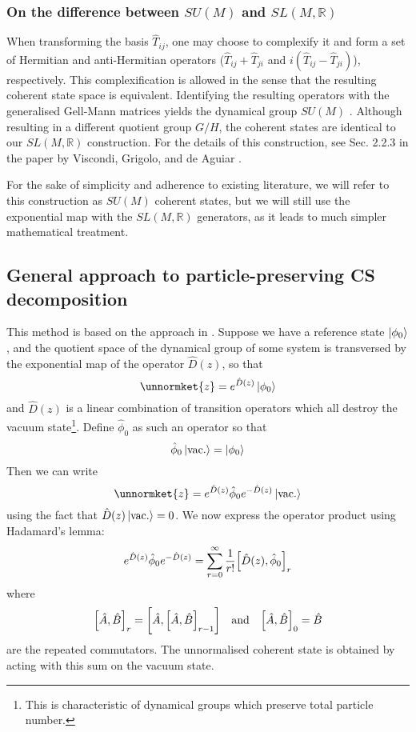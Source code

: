 \subsubsection{On the difference between $SU(M)$ and $SL(M,\mathbb{R})$}
	When transforming the basis $\hat{T}_{ij}$, one may choose to complexify it and form a set of Hermitian and anti-Hermitian operators ($\hat{T}_{ij}+\hat{T}_{ji}$ and $i(\hat{T}_{ij}-\hat{T}_{ji})$), respectively. This complexification is allowed in the sense that the resulting coherent state space is equivalent. Identifying the resulting operators with the generalised Gell-Mann matrices yields the dynamical group $SU(M)$ \cite{gellmann}. Although resulting in a different quotient group $G/H$, the coherent states are identical to our $SL(M,\mathbb{R})$ construction. For the details of this construction, see Sec. 2.2.3 in the paper by Viscondi, Grigolo, and de Aguiar \cite{aguiar}.
	
	For the sake of simplicity and adherence to existing literature, we will refer to this construction as $SU(M)$ coherent states, but we will still use the exponential map with the $SL(M,\mathbb{R})$ generators, as it leads to much simpler mathematical treatment.

\subsection{General approach to particle-preserving CS decomposition} \label{sec:general_decomposition}
	This method is based on the approach in \cite[App. E]{buonsante}. Suppose we have a reference state $\ket{\phi_0}$, and the quotient space of the dynamical group of some system is transversed by the exponential map of the operator $\hat{D}(z)$, so that
	\begin{equation}
	\unnormket{z}=e^{\hat{D}(z)}\ket{\phi_0}
	\end{equation}
	and $\hat{D}(z)$ is a linear combination of transition operators which all destroy the vacuum state\footnote{This is characteristic of dynamical groups which preserve total particle number.}. Define $\hat{\phi}_0$ as such an operator so that
	\begin{equation}
	\hat{\phi}_0\ket{\rm vac.} = \ket{\phi_0}
	\end{equation}
	Then we can write
	\begin{equation}
	\unnormket{z}=e^{\hat{D}(z)}\hat{\phi}_0e^{-\hat{D}(z)}\ket{\rm vac.}
	\end{equation}
	using the fact that $\hat{D}(z)\ket{\rm vac.}=0$. We now express the operator product using Hadamard's lemma:
	\begin{equation}\label{eq:hadamard sum}
	e^{\hat{D}(z)}\hat{\phi}_0e^{-\hat{D}(z)}=\sum_{r=0}^\infty \frac{1}{r!}\comm{\hat{D}(z)}{\hat{\phi}_0}_r
	\end{equation}
	where
	\begin{equation}
	\comm{\hat{A}}{\hat{B}}_r=\comm{\hat{A}}{\comm{\hat{A}}{\hat{B}}_{r-1}}\qq{and}\comm{\hat{A}}{\hat{B}}_0=\hat{B}
	\end{equation}
	are the repeated commutators. The unnormalised coherent state is obtained by acting with this sum on the vacuum state.
